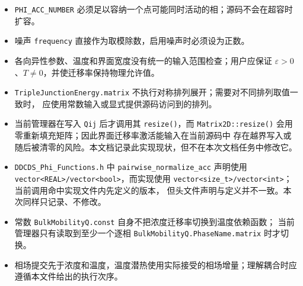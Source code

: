 \documentclass[UTF8,a4paper,11pt]{ctexart}
\newcommand{\code}[1]{\texttt{#1}}
\begin{document}
\begin{itemize}
  \item \code{PHI\_ACC\_NUMBER} 必须足以容纳一个点可能同时活动的相；源码不会在超容时扩容。
  \item 噪声 \code{frequency} 直接作为取模除数，启用噪声时必须设为正数。
  \item 各向异性参数、温度和界面宽度没有统一的输入范围检查；用户应保证
        $\varepsilon>0$、$T\ne0$，并使迁移率保持物理允许值。
  \item \code{TripleJunctionEnergy.matrix} 不执行对称排列展开；需要对不同排列取值一致时，
        应使用常数输入或显式提供源码访问到的排列。
  \item 当前管理器在写入 \code{Qij} 后才调用其 \code{resize()}，而
        \code{Matrix2D::resize()} 会用零重新填充矩阵；因此界面迁移率激活能输入在当前源码中
        存在越界写入或随后被清零的风险。本文档记录此实现现状，但不在本次文档任务中修改它。
  \item \code{DDCDS\_Phi\_Functions.h} 中 \code{pairwise\_normalize\_acc}
        声明使用 \code{vector<REAL>/vector<bool>}，而实现使用
        \code{vector<size\_t>/vector<int>}；当前调用命中实现文件内先定义的版本，
        但头文件声明与定义并不一致。本次同样只记录、不修改。
  \item 常数 \code{BulkMobilityQ.const} 自身不把浓度迁移率切换到温度依赖函数；
        当前管理器只有读取到至少一个逐相 \code{BulkMobilityQ.PhaseName.matrix} 时才切换。
  \item 相场提交先于浓度和温度，温度潜热使用实际接受的相场增量；理解耦合时应遵循本文件给出的执行次序。
\end{itemize}
\end{document}
